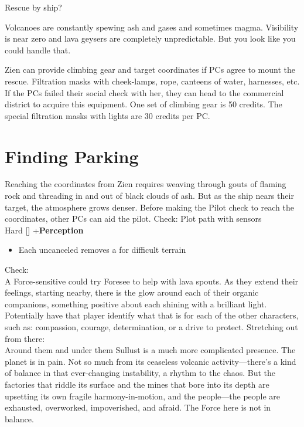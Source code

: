 \documentclass{book}
\newcommand{\df}{\difficulty}
\begin{document}
\begin{multicols*}{2}
Rescue by ship? \\
\begin{quoting}
Volcanoes are constantly spewing ash and gases and sometimes magma. Visibility is near zero and lava geysers are completely unpredictable.  But you look like you could handle that.
\end{quoting}

Zien can provide climbing gear and target coordinates if PCs agree to mount the rescue. Filtration masks with cheek-lamps, rope, canteens of water, harnesses, etc. If the PCs failed their social check with her, they can head to the commercial district to acquire this equipment. One set of climbing gear is 50 credits. The special filtration masks with lights are 30 credits per PC.


\section{Finding Parking}

Reaching the coordinates from Zien requires weaving through gouts of flaming rock and threading in and out of black clouds of ash. But as the ship nears their target, the atmosphere grows denser. Before making the Pilot check to reach the coordinates, other PCs can aid the pilot.
Check: Plot path with sensors\\
Hard [\df\df\df] +\setback  \textbf{Perception}
\begin{itemize}
\item \success Each uncanceled \success removes a \setback for difficult terrain
\end{itemize}
Check:\\
A Force-sensitive could try Foresee to help with lava spouts. As they extend their feelings, starting nearby, there is the glow around each of their organic companions, something positive about each shining with a brilliant light. Potentially have that player identify what that is for each of the other characters, such as: compassion, courage, determination, or a drive to protect.
Stretching out from there: \\
Around them and under them Sullust is a much more complicated presence. The planet is in pain. Not so much from its ceaseless volcanic activity—there’s a kind of balance in that ever-changing instability, a rhythm to the chaos. But the factories that riddle its surface and the mines that bore into its depth are upsetting its own fragile harmony-in-motion, and the people—the people are exhausted, overworked, impoverished, and afraid. The Force here is not in balance.


\end{multicols*}
\end{document}
